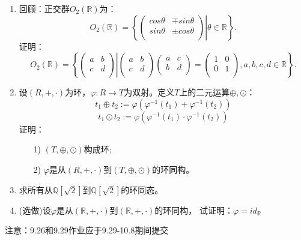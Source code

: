 \documentclass[a4paper,12pt]{article}
\begin{document}
\begin{enumerate}
     \item  回顾：正交群$O_2(\mathbb{R})$为：
      \[O_2(\mathbb R)=\left\{\left.\begin{pmatrix} cos \theta & \mp sin \theta \\ sin \theta & \pm cos \theta\\\end{pmatrix}\right|\theta\in\mathbb R\right\}.\]
     证明：
     \[O_2(\mathbb R)=\left\{\left.\begin{pmatrix} a & b \\ c & d\\\end{pmatrix}\right|\begin{pmatrix} a & b \\ c & d\\\end{pmatrix} \begin{pmatrix} a & c \\ b & d\\\end{pmatrix} = \begin{pmatrix} 1 & 0 \\ 0 & 1\\\end{pmatrix}, a,b,c,d\in\mathbb R\right\}.\]
     \newpage
     
     \item 设$(R, +, \cdot)$为环，$\varphi:R \rightarrow T$为双射。定义$T$上的二元运算$\oplus,\odot$：
     $$t_1 \oplus t_2 := \varphi(\varphi^{-1}(t_1) + \varphi^{-1}(t_2))$$
     $$t_1 \odot t_2 := \varphi(\varphi^{-1}(t_1) \cdot \varphi^{-1}(t_2))$$
     证明：
     \begin{itemize}
         \item[1)] $(T, \oplus, \odot)$构成环;
         \item[2)] $\varphi$是从$(R, +, \cdot)$到$(T, \oplus, \odot)$的环同构。
     \end{itemize}
     
     \item 求所有从$\mathbb{Q}[\sqrt{2}]$到$\mathbb{Q}[\sqrt{2}]$的环同态。
     
     \item {\color{red} (选做)}设$\varphi$是从$(\mathbb{R}, +, \cdot)$到$(\mathbb{R}, +, \cdot)$的环同构，
     试证明：$\varphi=id_{\mathbb{R}}$
 \end{enumerate}

{\color{red} 注意：9.26和9.29作业应于9.29-10.8期间提交}
\end{document}
